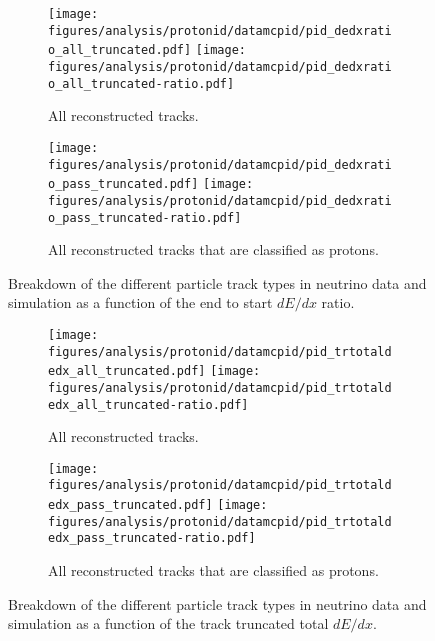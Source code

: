     \begin{figure}[h]
      \centering
      \begin{subfigure}[t]{2.8in}
        \texttt{[image: figures/analysis/protonid/datamcpid/pid\_dedxratio\_all\_truncated.pdf]}
        \texttt{[image: figures/analysis/protonid/datamcpid/pid\_dedxratio\_all\_truncated-ratio.pdf]}
        \caption{All reconstructed tracks.}
      \end{subfigure}
      \hspace{2pt}
      \begin{subfigure}[t]{2.8in}
        \texttt{[image: figures/analysis/protonid/datamcpid/pid\_dedxratio\_pass\_truncated.pdf]}
        \texttt{[image: figures/analysis/protonid/datamcpid/pid\_dedxratio\_pass\_truncated-ratio.pdf]}
        \caption{All reconstructed tracks that are classified as protons.}
      \end{subfigure}
      \caption{Breakdown of the different particle track types in neutrino data
      and simulation as a function of the end to start $dE/dx$ ratio.}
      \label{fig:piddedxratio}
    \end{figure}
    \begin{figure}[h]
      \centering
      \begin{subfigure}[t]{2.8in}
        \texttt{[image: figures/analysis/protonid/datamcpid/pid\_trtotaldedx\_all\_truncated.pdf]}
        \texttt{[image: figures/analysis/protonid/datamcpid/pid\_trtotaldedx\_all\_truncated-ratio.pdf]}
        \caption{All reconstructed tracks.}
      \end{subfigure}
      \hspace{2pt}
      \begin{subfigure}[t]{2.8in}
        \texttt{[image: figures/analysis/protonid/datamcpid/pid\_trtotaldedx\_pass\_truncated.pdf]}
        \texttt{[image: figures/analysis/protonid/datamcpid/pid\_trtotaldedx\_pass\_truncated-ratio.pdf]}
        \caption{All reconstructed tracks that are classified as protons.}
      \end{subfigure}
      \caption{Breakdown of the different particle track types in neutrino data
      and simulation as a function of the track truncated total $dE/dx$.}
      \label{fig:pidtrtotaldedx}
    \end{figure}

